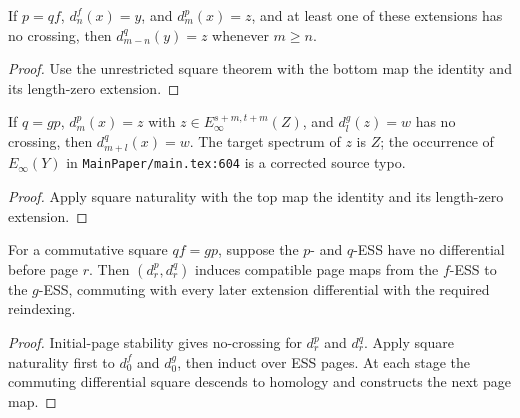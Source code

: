 \begin{corollary}
  \label{cor:fess-triangle-shift}
  \notready
  If $p=qf$, $d_n^f(x)=y$, and $d_m^p(x)=z$, and at least one of these
  extensions has no crossing, then $d_{m-n}^q(y)=z$ whenever $m\ge n$.
\end{corollary}

\begin{proof}
  Use the unrestricted square theorem with the bottom map the identity and
  its length-zero extension.
\end{proof}

\begin{corollary}
  \label{cor:fess-composition}
  \notready
  If $q=gp$, $d_m^p(x)=z$ with
  $z\in E_\infty^{s+m,t+m}(Z)$, and $d_l^g(z)=w$ has no crossing, then
  $d_{m+l}^q(x)=w$.  The target spectrum of $z$ is $Z$; the occurrence of
  $E_\infty(Y)$ in \texttt{MainPaper/main.tex:604} is a corrected source typo.
\end{corollary}

\begin{proof}
  Apply square naturality with the top map the identity and its length-zero
  extension.
\end{proof}

\begin{corollary}
  \label{cor:fess-map-of-stable-pages}
  \notready
  For a commutative square $qf=gp$, suppose the $p$- and $q$-ESS have no
  differential before page $r$.  Then $(d_r^p,d_r^q)$ induces compatible page
  maps from the $f$-ESS to the $g$-ESS, commuting with every later extension
  differential with the required reindexing.
\end{corollary}

\begin{proof}
  Initial-page stability gives no-crossing for $d_r^p$ and $d_r^q$.  Apply
  square naturality first to $d_0^f$ and $d_0^g$, then induct over ESS pages.
  At each stage the commuting differential square descends to homology and
  constructs the next page map.
\end{proof}

